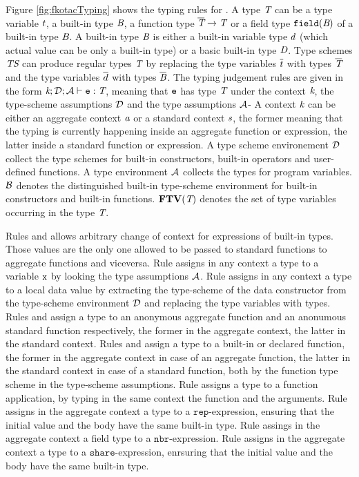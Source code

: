 Figure \ref{fig:fkotacTyping} shows the typing rules for \FKotac{}. A type $\textit{T}$ can be a type variable $t$, a built-in type $\textit{B}$, a function type $\overline{\textit{T}}\to\textit{T}$ or a field type $\mathtt{field}(\textit{B})$ of a built-in type  $\textit{B}$. A built-in type $\textit{B}$ is either a built-in variable type $d$ (which actual value can be only a built-in type) or a basic built-in type $\textit{D}$. Type schemes $\textit{TS}$ can produce regular types $\textit{T}$ by replacing the type variables $\overline{t}$ with types $\overline{\textit{T}}$ and the type variables $\overline{d}$ with types $\overline{\textit{B}}$. The typing judgement rules are given in the form $\textit{k} ; \mathcal{D} ; \mathcal{A} \vdash \mathtt{e} : \textit{T}$, meaning that $\mathtt{e}$ has type $\textit{T}$ under the context $\textit{k}$, the type-scheme assumptions $\mathcal{D}$ and the type assumptions $\mathcal{A}$- A context $\textit{k}$ can be either an aggregate context $\textit{a}$ or a standard context $\textit{s}$, the former meaning that the typing is currently happening inside an aggregate function or expression, the latter inside a standard function or expression.  A type scheme environement $\mathcal{D}$ collect the type schemes for built-in constructors, built-in operators and user-defined functions. A type environment $\mathcal{A}$ collects the types for program variables. $\mathcal{B}$ denotes the distinguished built-in type-scheme environment for built-in constructors and built-in functions. $\textbf{FTV}(\textit{T})$ denotes the set of type variables occurring in the type $\textit{T}$.

Rules  and  allows arbitrary change of context for expressions of built-in types. Those values are the only one allowed to be passed to standard functions to aggregate functions and viceversa. Rule  assigns in any context a type to a variable $\mathtt{x}$ by looking the type assumptions $\mathcal{A}$. Rule  assigns in any context a type to a local data value by extracting the type-scheme of the data constructor from the type-scheme environment $\mathcal{D}$ and replacing the type variables with types. Rules  and  assign a type to an anonymous aggregate function and an anonumous standard function respectively, the former in the aggregate context, the latter in the standard context. Rules  and  assign a type to a built-in or declared function, the former in the aggregate context in case of an aggregate function, the latter in the standard context in case of a standard function, both by the function type scheme in the type-scheme assumptions. Rule  assigns a type to a function application, by typing in the same context the function and the arguments. Rule  assigns in the aggregate context a type to a $\mathtt{rep}$-expression, ensuring that the initial value and the body have the same built-in type. Rule  assings in the aggregate context a field type to a $\mathtt{nbr}$-expression. Rule  assigns in the aggregate context a type to a $\mathtt{share}$-expression, enrsuring that the initial value and the body have the same built-in type.

